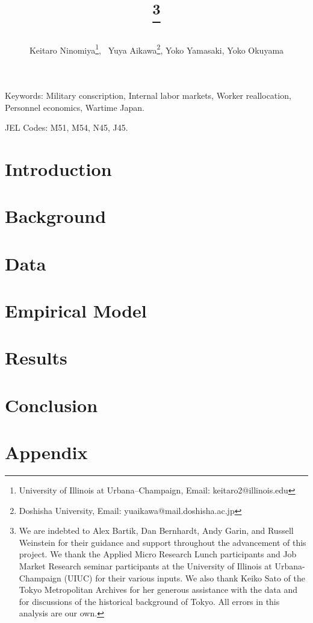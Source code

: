 \documentclass[12pt]{article}
\title{\vspace{-2cm}
\thanks{We are indebted to Alex Bartik, Dan Bernhardt, Andy Garin, and Russell Weinstein for their
guidance and support throughout the advancement of this project. We thank the Applied Micro Research Lunch participants and Job Market
Research seminar participants at the University of Illinois at Urbana-Champaign (UIUC) for their various
inputs. We also thank Keiko Sato of the Tokyo Metropolitan Archives for her generous assistance with the data and for discussions of the historical background of Tokyo. All errors in this analysis are our own.}
\author{Keitaro Ninomiya\thanks{University of Illinois at Urbana--Champaign, Email: keitaro2@illinois.edu}, \ Yuya Aikawa\thanks{Doshisha University, Email: yuaikawa@mail.doshisha.ac.jp}, Yoko Yamasaki, Yoko Okuyama}
\date{}
}
\begin{document}
\maketitle



\noindent Keywords: Military conscription, Internal labor markets, Worker reallocation, Personnel economics, Wartime Japan.

\noindent JEL Codes: M51, M54, N45, J45.
\thispagestyle{empty}  %
\newpage
\setcounter{page}{1}   %


\section{Introduction}


\section{Background}


\section{Data}


\section{Empirical Model}


\section{Results}


\section{Conclusion}




\FloatBarrier %
\singlespacing


\newpage
\appendix
\section{Appendix}

\end{document}
